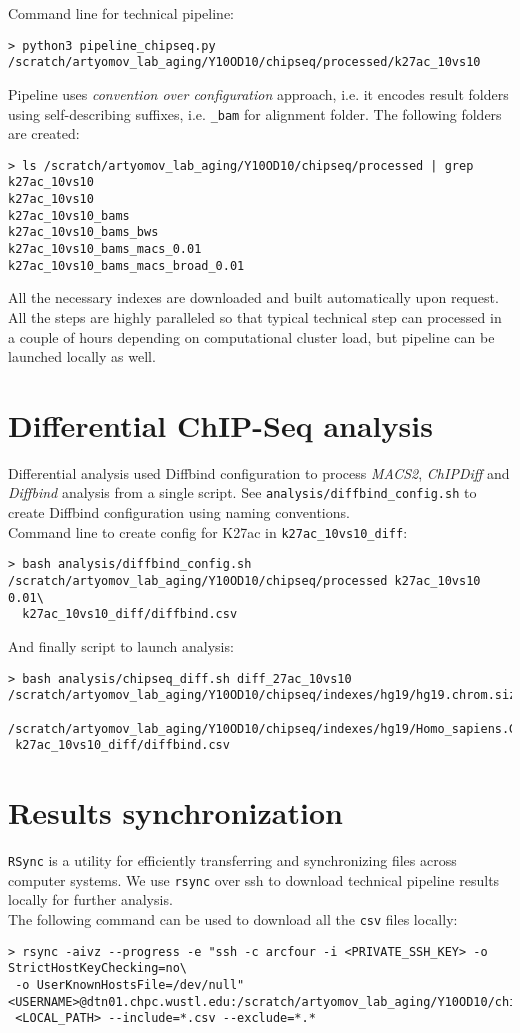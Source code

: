 \documentclass{article}
\begin{document}
Command line for technical pipeline:
\begin{lstlisting}
> python3 pipeline_chipseq.py /scratch/artyomov_lab_aging/Y10OD10/chipseq/processed/k27ac_10vs10 
\end{lstlisting}

Pipeline uses \textit{convention over configuration} approach, i.e. it encodes result folders using self-describing suffixes, i.e. \texttt{\_bam} for alignment folder. The following folders are created:
\begin{lstlisting}
> ls /scratch/artyomov_lab_aging/Y10OD10/chipseq/processed | grep k27ac_10vs10
k27ac_10vs10
k27ac_10vs10_bams
k27ac_10vs10_bams_bws
k27ac_10vs10_bams_macs_0.01
k27ac_10vs10_bams_macs_broad_0.01
\end{lstlisting}

All the necessary indexes are downloaded and built automatically upon request. All the steps are highly paralleled so that typical technical step can processed in a couple of hours depending on computational cluster load, but pipeline can be launched locally as well.

\section{Differential ChIP-Seq analysis}
Differential analysis used Diffbind configuration to process \textit{MACS2}, \textit{ChIPDiff} and \textit{Diffbind} analysis from a single script.
See \texttt{analysis/diffbind\_config.sh} to create Diffbind configuration using naming conventions.\\
Command line to create config for K27ac in \texttt{k27ac\_10vs10\_diff}:\\
\begin{lstlisting}
> bash analysis/diffbind_config.sh /scratch/artyomov_lab_aging/Y10OD10/chipseq/processed k27ac_10vs10 0.01\
  k27ac_10vs10_diff/diffbind.csv
\end{lstlisting}

And finally script to launch analysis:
\begin{lstlisting}
> bash analysis/chipseq_diff.sh diff_27ac_10vs10 /scratch/artyomov_lab_aging/Y10OD10/chipseq/indexes/hg19/hg19.chrom.sizes\
 /scratch/artyomov_lab_aging/Y10OD10/chipseq/indexes/hg19/Homo_sapiens.GRCh37.87.gtf.gz\
 k27ac_10vs10_diff/diffbind.csv
\end{lstlisting}
\section{Results synchronization}
\texttt{RSync} is a utility for efficiently transferring and synchronizing files across computer systems. We use \texttt{rsync} over ssh to download technical pipeline results locally for further analysis.\\
The following command can be used to download all the \texttt{csv} files locally:
\begin{lstlisting}
> rsync -aivz --progress -e "ssh -c arcfour -i <PRIVATE_SSH_KEY> -o StrictHostKeyChecking=no\
 -o UserKnownHostsFile=/dev/null" <USERNAME>@dtn01.chpc.wustl.edu:/scratch/artyomov_lab_aging/Y10OD10/chipseq/\
 <LOCAL_PATH> --include=*.csv --exclude=*.* 
\end{lstlisting}
\end{document}
